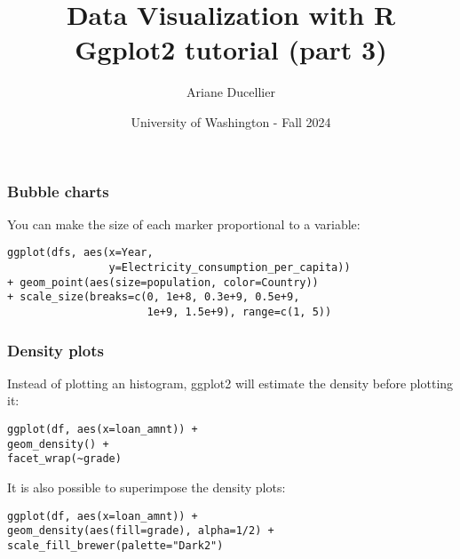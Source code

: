 \documentclass{beamer}
\title[Data Visualization with R - Ggplot2 tutorial (part 3)]{Data Visualization with R \\ Ggplot2 tutorial (part 3)}
\author{Ariane Ducellier}
\date{University of Washington - Fall 2024}
\begin{document}
	\begin{frame}
		\titlepage
	\end{frame}

	\begin{frame}[fragile]
		\frametitle{Bubble charts}

		You can make the size of each marker proportional to a variable:

		\vspace{2em}

		\begin{exampleblock}{}
		\begin{BVerbatim}
ggplot(dfs, aes(x=Year,
                y=Electricity_consumption_per_capita))
+ geom_point(aes(size=population, color=Country))
+ scale_size(breaks=c(0, 1e+8, 0.3e+9, 0.5e+9,
                      1e+9, 1.5e+9), range=c(1, 5))
		\end{BVerbatim}
		\end{exampleblock}{}

	\end{frame}

	\begin{frame}[fragile]
		\frametitle{Density plots}

		Instead of plotting an histogram, ggplot2 will estimate the density before plotting it:

		\vspace{1em}

		\begin{exampleblock}{}
		\begin{BVerbatim}
ggplot(df, aes(x=loan_amnt)) + 
geom_density() + 
facet_wrap(~grade)
		\end{BVerbatim}
		\end{exampleblock}{}

		\vspace{1em}

		It is also possible to superimpose the density plots:

		\vspace{1em}
	
		\begin{exampleblock}{}
		\begin{BVerbatim}
ggplot(df, aes(x=loan_amnt)) + 
geom_density(aes(fill=grade), alpha=1/2) +
scale_fill_brewer(palette="Dark2")
		\end{BVerbatim}
		\end{exampleblock}{}

	\end{frame}
\end{document}
